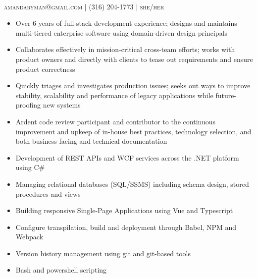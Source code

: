 \newpage
\oddsidemargin=-17pt 
\headheight=0pt

\begin{center}

\\
\vspace{8pt}
\normalsize \textsc{amandaryman@gmail.com | (316) 204-1773 | she/her}

\end{center}



\begin{itemize}
\item Over 6 years of full-stack development experience; designs and maintains multi-tiered enterprise software using domain-driven design principals 
\item Collaborates effectively in mission-critical cross-team efforts; works with product owners and directly with clients to tease out requirements and ensure product correctness
\item Quickly triages and investigates production issues; seeks out ways to improve stability, scalability and performance of legacy applications while future-proofing new systems
\item Ardent code review participant and contributor to the continuous improvement and upkeep of in-house best practices, technology selection, and both business-facing and technical documentation
\end{itemize}



\begin{itemize}
\item Development of REST APIs and WCF services across the .NET platform using C\# 
\item Managing relational databases (SQL/SSMS) including schema design, stored procedures and views
\item Building responsive Single-Page Applications using Vue and Typescript
\item Configure transpilation, build and deployment through Babel, NPM and Webpack
\item Version history management using git and git-based tools
\item Bash and powershell scripting
\end{itemize}


